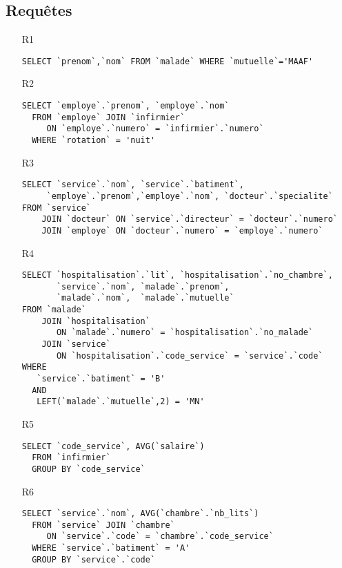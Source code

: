 \clearpage

\subsection*{Requêtes}
\begin{enumerate}
  \item[R1] 
\begin{verbatim}
SELECT `prenom`,`nom` FROM `malade` WHERE `mutuelle`='MAAF'
\end{verbatim}

  \item[R2]
\begin{verbatim}
SELECT `employe`.`prenom`, `employe`.`nom` 
  FROM `employe` JOIN `infirmier` 
     ON `employe`.`numero` = `infirmier`.`numero` 
  WHERE `rotation` = 'nuit'
\end{verbatim}

  \item[R3]
\begin{verbatim}
SELECT `service`.`nom`, `service`.`batiment`, 
     `employe`.`prenom`,`employe`.`nom`, `docteur`.`specialite`
FROM `service` 
    JOIN `docteur` ON `service`.`directeur` = `docteur`.`numero`
    JOIN `employe` ON `docteur`.`numero` = `employe`.`numero`
\end{verbatim}

  \item[R4]
\begin{verbatim}
SELECT `hospitalisation`.`lit`, `hospitalisation`.`no_chambre`,
       `service`.`nom`, `malade`.`prenom`, 
       `malade`.`nom`,  `malade`.`mutuelle` 
FROM `malade`
    JOIN `hospitalisation` 
       ON `malade`.`numero` = `hospitalisation`.`no_malade`
    JOIN `service`
       ON `hospitalisation`.`code_service` = `service`.`code` 
WHERE 
   `service`.`batiment` = 'B'
  AND
   LEFT(`malade`.`mutuelle`,2) = 'MN'
\end{verbatim}

  \item[R5]
\begin{verbatim}
SELECT `code_service`, AVG(`salaire`) 
  FROM `infirmier` 
  GROUP BY `code_service`
\end{verbatim}

  \item[R6]
\begin{verbatim}
SELECT `service`.`nom`, AVG(`chambre`.`nb_lits`)
  FROM `service` JOIN `chambre`
     ON `service`.`code` = `chambre`.`code_service`
  WHERE `service`.`batiment` = 'A'
  GROUP BY `service`.`code`
\end{verbatim}


\end{enumerate}
